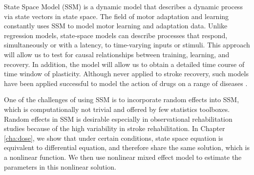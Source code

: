 State Space Model (SSM) is a dynamic model that describes a dynamic process via state vectors in state space.
The field of motor adaptation and learning constantly uses SSM to model motor learning and adaptation data.
Unlike regression models, state-space models can describe processes that respond, simultaneously or with a latency, to time-varying inputs or stimuli.
This approach will allow us to test for causal relationships between training, learning, and recovery. 
In addition, the model will allow us to obtain a detailed time course of time window of plasticity. 
Although never applied to stroke recovery, such models have been applied successful to model the action of drugs on a range of diseases \cite{Tan2000}.

One of the challenges of using SSM is to incorporate random effects into SSM, which is computationally not trivial and offered by few statistics toolboxes.
Random effects in SSM is desirable especially in observational rehabilitation studies because of the high variability in stroke rehabilitation.
In Chapter \ref{cha:dose}, we show that under certain conditions, state space equation is equivalent to differential equation, and therefore share the same solution, which is a nonlinear function.
We then use nonlinear mixed effect model to estimate the parameters in this nonlinear solution.
